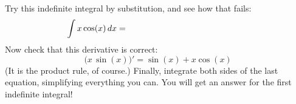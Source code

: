 Try this indefinite integral by substitution, and see how that fails:
    $$\int x \cos(x)\,dx = \hspace{2.0in}$$
Now check that this derivative is correct:
    $$\Big(x\,\sin(x)\Big)' = \sin(x) + x \cos(x)$$
(It is the product rule, of course.)  Finally, integrate both sides of the last equation, simplifying everything you can.  You will get an answer for the first indefinite integral!